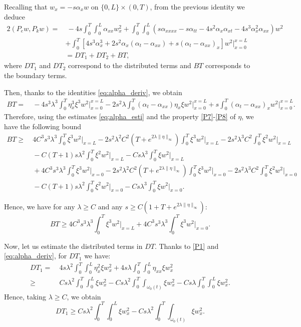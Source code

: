 \documentclass[10pt]{article}
\def\om{\omega}
\def\\Phivec{\mathbf{\Phi}}
\newcommand{\ii}{\iiTL }
\newcommand{\iiTL}{\int_0^T\!\!\!\!\int_0^L }
\begin{document}
\begin{appendix}
	Recalling that  $w_x=-s \alpha_x w $ on $\{0,L\}\times(0,T)$, from the previous identity we deduce
\begin{equation}\label{eq:inner}
\begin{alignedat}{2}	
	2(P_ew,P_kw)=&~-4s\ii \alpha_{xx}w_x^2+ \ii \left(s\alpha_{xxxx}-s\alpha_{tt}-4s^2\alpha_x\alpha_{xt}
	-4s^3\alpha_x^2\alpha_{xx} \right)w^2\\
	&+\int_0^T\left[4s^3\alpha_x^3 +2s^2\alpha_x\left(\alpha_t - \alpha_{xx}\right) +s(\alpha_t-\alpha_{xx})_x\right]
	w^2\bigg|_{x=0}^{x=L} \\
	&= DT_1+DT_2+BT,
\end{alignedat}
\end{equation}
	where $DT_1$ and $DT_2$ correspond to the distributed terms and $BT$ corresponds to the boundary terms.

Then, thanks to the identities \eqref{eq:alpha_deriv}, we obtain
\begin{align*}
	BT=&~-4s^3\lambda^3\int_0^T\eta_x^3\xi^3 w^2\bigg|_{x=0}^{x=L}
	-2s^2\lambda\int_0^T\left(\alpha_t - \alpha_{xx}\right)\eta_x\xi w^2\bigg|_{x=0}^{x=L}
	+s\int_0^T (\alpha_t-\alpha_{xx})_xw^2\bigg|_{x=0}^{x=L}.
\end{align*}	
	Therefore, using the estimates \eqref{eq:alpha_esti} and the property \eqref{P7}-\eqref{P8} of $\eta$,
	we have the following bound
\begin{align*}
	BT\geq&~4C^3s^3\lambda^3\int_0^T\xi^3 w^2\big|_{x=L}
	-2s^2\lambda^2C^2\left(T+e^{2\lambda\|\eta\|_\infty}\right)\int_0^T\xi^3 w^2\big|_{x=L}
	-2s^2\lambda^3C^2\int_0^T\xi^2 w^2\big|_{x=L}\\
	&~-C(T+1)s\lambda^2\int_0^T \xi^2w^2\big|_{x=L}
	-Cs\lambda^3\int_0^T \xi w^2\bigg|_{x=L}\\
	&~+4C^3s^3\lambda^3\int_0^T\xi^3 w^2\big|_{x=0}
	-2s^2\lambda^2C^2\left(T+e^{2\lambda\|\eta\|_\infty}\right)\int_0^T\xi^3 w^2\big|_{x=0}
	-2s^2\lambda^3C^2\int_0^T\xi^2 w^2\big|_{x=0}\\
	&~-C(T+1)s\lambda^2\int_0^T \xi^2w^2\big|_{x=0}
	-Cs\lambda^3\int_0^T \xi w^2\bigg|_{x=0}.
\end{align*}

	Hence, we have for any $\lambda\geq C$ and any
	$s\geq C\left(1+T+e^{2\lambda\|\eta\|_\infty}\right)$:
\begin{equation}\label{eq:BT}
	BT\geq4C^3s^3\lambda^3\int_0^T\xi^3 w^2\big|_{x=L}+4C^3s^3\lambda^3\int_0^T\xi^3 w^2\big|_{x=0}.
\end{equation}

	Now, let us estimate the distributed terms in $DT$. Thanks to \eqref{P1} and \eqref{eq:alpha_deriv},
	for $DT_1$ we have:
\begin{align*}\label{eq:BT}
	DT_1=&~4s\lambda^2\ii \eta_x^2\xi w_x^2
	+4s\lambda\ii \eta_{xx}\xi w_x^2\\
	\geq&~Cs\lambda^2\ii \xi w_x^2 - Cs\lambda^2\int_0^T\!\!\!\int_{\om_0(t)}\xi w_x^2
	-Cs\lambda\ii \xi w_x^2.
\end{align*}
	Hence, taking $\lambda\geq C$, we obtain
\begin{equation}\label{eq:DT1}
	DT_1\geq Cs\lambda^2\ii \xi w_x^2 - Cs\lambda^2\int_0^T\!\!\!\int_{\om_0(t)}\xi w_x^2.
\end{equation}


\end{appendix}
\end{document}
